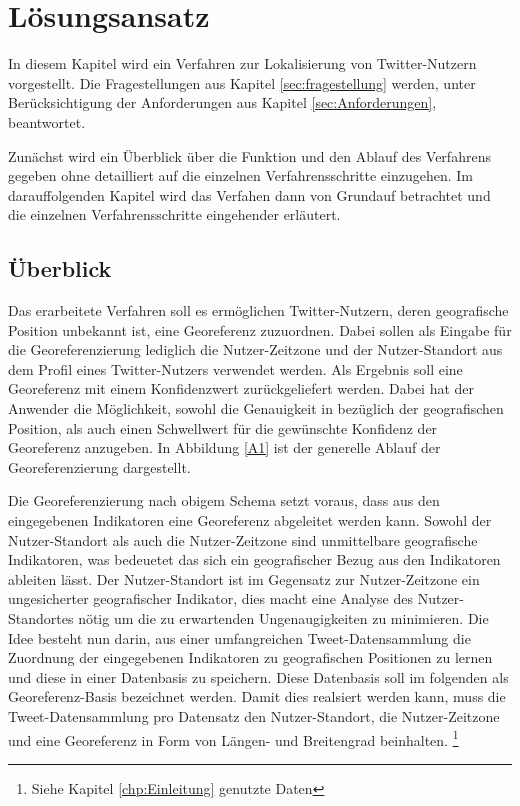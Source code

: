 \chapter{Lösungsansatz} \label{chp:Loesungsansatz}
In diesem Kapitel wird ein Verfahren zur Lokalisierung von Twitter-Nutzern vorgestellt.
Die Fragestellungen aus Kapitel \ref{sec:fragestellung} werden, unter Berücksichtigung der Anforderungen aus Kapitel \ref{sec:Anforderungen}, beantwortet.  

Zunächst wird ein Überblick über die Funktion und den Ablauf des Verfahrens gegeben ohne detailliert auf die einzelnen Verfahrensschritte einzugehen.
Im darauffolgenden Kapitel wird das Verfahen dann von Grundauf betrachtet und die einzelnen Verfahrensschritte eingehender erläutert. 


	\section{Überblick}
	Das erarbeitete Verfahren soll es ermöglichen Twitter-Nutzern, deren geografische Position unbekannt ist, eine Georeferenz zuzuordnen.
	Dabei sollen als Eingabe für die Georeferenzierung lediglich die Nutzer-Zeitzone und der Nutzer-Standort aus dem Profil eines Twitter-Nutzers verwendet werden.
	Als Ergebnis soll eine Georeferenz mit einem Konfidenzwert zurückgeliefert werden. 
	Dabei hat der Anwender die Möglichkeit, sowohl die Genauigkeit in bezüglich der geografischen Position, als auch einen Schwellwert für die gewünschte Konfidenz der Georeferenz anzugeben.
	In Abbildung \ref{A1} ist der generelle Ablauf der Georeferenzierung dargestellt. 
	\label{A1} 

	Die Georeferenzierung nach obigem Schema setzt voraus, dass aus den eingegebenen Indikatoren eine Georeferenz abgeleitet werden kann.
	Sowohl der Nutzer-Standort als auch die Nutzer-Zeitzone sind unmittelbare geografische Indikatoren, was bedeuetet das sich ein geografischer Bezug aus den Indikatoren ableiten lässt. 
	Der Nutzer-Standort ist im Gegensatz zur Nutzer-Zeitzone ein ungesicherter geografischer Indikator, dies macht eine Analyse des Nutzer-Standortes nötig um die zu erwartenden Ungenaugigkeiten zu minimieren.     
	Die Idee besteht nun darin, aus einer umfangreichen Tweet-Datensammlung die Zuordnung der eingegebenen Indikatoren zu geografischen Positionen zu lernen und diese in einer Datenbasis zu speichern.
	Diese Datenbasis soll im folgenden als Georeferenz-Basis bezeichnet werden.
	Damit dies realsiert werden kann, muss die Tweet-Datensammlung pro Datensatz den Nutzer-Standort, die Nutzer-Zeitzone und eine Georeferenz in Form von Längen- und Breitengrad beinhalten.  \footnote{Siehe Kapitel \ref{chp:Einleitung} genutzte Daten}
	
